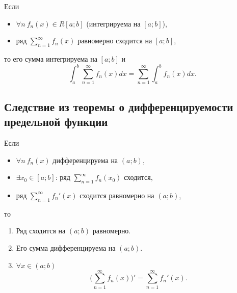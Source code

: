 \begin{corollary}
    Если
    \begin{itemize}
        \item $\forall n \ f_n(x) \in R[a;b]$ (интегрируема на $[a;b]$),
        \item ряд $\sum_{n=1}^{\infty}f_n(x)$ равномерно сходится на $[a;b]$,
    \end{itemize}
    то его сумма интегрируема на $[a;b]$ и
    \[
        \int_{a}^{b}\sum_{n=1}^{\infty}f_n(x)dx = \sum_{n=1}^{\infty}\int_{a}^{b}f_n(x)dx.
    \]
\end{corollary}

\newpage

\subsection{Следствие из теоремы о дифференцируемости предельной функции}

\begin{corollary}
    Если
    \begin{itemize}
        \item $\forall n \ f_n(x)$ дифференцируема на $(a;b)$,
        \item $\exists x_0 \in [a;b]$: ряд $\sum_{n=1}^{\infty}f_n(x_0)$ сходится,
        \item ряд $\sum_{n=1}^{\infty}f_n'(x)$ сходится равномерно на $(a;b)$,
    \end{itemize}
    то \begin{enumerate}
        \item Ряд сходится на $(a;b)$ равномерно.
        \item Его сумма дифференцируема на $(a;b)$.
        \item $\forall x \in (a;b)$
              \[
                  \bigg(\sum_{n=1}^{\infty}f_n(x)\bigg)' = \sum_{n=1}^{\infty}f_n'(x).
              \]
    \end{enumerate}
\end{corollary}
